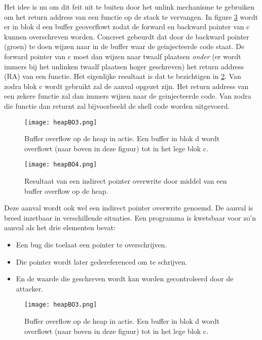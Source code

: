 \documentclass[../main.tex]{subfiles}
\begin{document}
Het idee is nu om dit feit uit te buiten door het unlink mechanisme te gebruiken om het return address van een functie op de stack te vervangen.
In figure \ref{f:heapBO3} wordt er in blok d een buffer geoverflowt zodat de forward en backward pointer van c kunnen overschreven worden.
Concreet gebeurdt dat door de backward pointer (groen) te doen wijzen naar in de buffer waar de geinjecteerde code staat.
De forward pointer van c moet dan wijzen naar twaalf plaatsen \emph{onder} (er wordt immers bij het unlinken twaalf plaatsen hoger geschreven) het return address (RA) van een functie.
Het eigenlijke resultaat is dat te bezichtigen in \ref{f:heapBO4}.
Van zodra blok c wordt gebruikt zal de aanval opgezet zijn.
Het return address van een zekere functie zal dan immers wijzen naar de geinjecteerde code.
Van zodra die functie dan returnt zal bijvoorbeeld de shell code worden uitgevoerd.

\begin{figure}
\centering
\texttt{[image: heapBO3.png]}
\caption{Buffer overflow op de heap in actie. Een buffer in blok d wordt overflowt (naar boven in deze figuur) tot in het lege blok c.}
\label{f:heapBO3}
\end{figure}

\begin{figure}
\centering
\texttt{[image: heapBO4.png]}
\caption{Resultaat van een indirect pointer overwrite door middel van een buffer overflow op de heap.}
\label{f:heapBO4}
\end{figure}

Deze aanval wordt ook wel een indirect pointer overwrite genoemd.
De aanval is breed inzetbaar in verschillende situaties.
Een programma is kwetsbaar voor zo'n aanval als het drie elementen bevat:
\begin{itemize}
		\item Een bug die toelaat een pointer te overschrijven.
		\item Die pointer wordt later gedereferenced om te schrijven.
		\item En de waarde die geschreven wordt kan worden gecontroleerd door de attacker.
\end{itemize}


\begin{figure}
\centering
\texttt{[image: heapBO3.png]}
\caption{Buffer overflow op de heap in actie. Een buffer in blok d wordt overflowt (naar boven in deze figuur) tot in het lege blok c.}
\label{f:heapBO3}
\end{figure}
\end{document}
